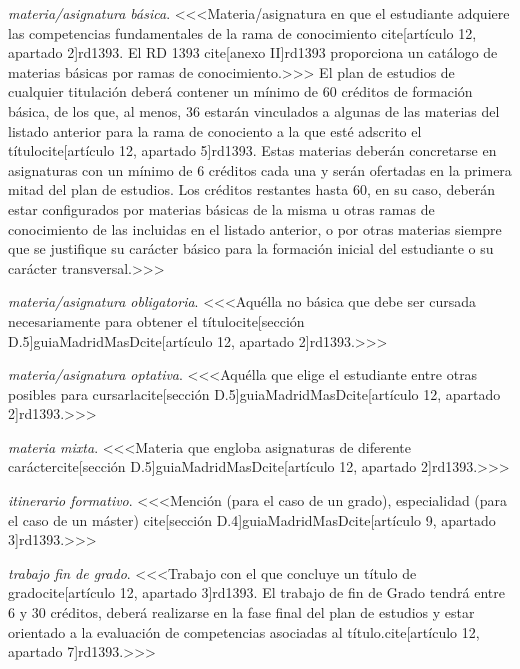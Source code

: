     \item \emph{materia/asignatura básica}. <<<Materia/asignatura en que el estudiante adquiere las competencias fundamentales de la rama de conocimiento cite[artículo 12, apartado 2]{rd1393}. El RD 1393 cite[anexo II]{rd1393} proporciona un catálogo de materias básicas por ramas de conocimiento.>>> El plan de estudios de cualquier titulación deberá contener un mínimo de 60 créditos de formación básica, de los que, al menos, 36 estarán vinculados a algunas de las materias del listado anterior para la rama de conociento a la que esté adscrito el títulocite[artículo 12, apartado 5]{rd1393}.  Estas materias deberán concretarse en asignaturas con un mínimo de 6 créditos cada una y serán ofertadas en la primera mitad del plan de estudios.  Los créditos restantes hasta 60, en su caso, deberán estar configurados por materias básicas de la misma u otras ramas de conocimiento de las incluidas en el listado anterior, o por otras materias siempre que se justifique su carácter básico para la formación inicial del estudiante o su carácter transversal.>>>

    \item \emph{materia/asignatura obligatoria}. <<<Aquélla no básica que debe ser cursada necesariamente para obtener el títulocite[sección D.5]{guiaMadridMasD}cite[artículo 12, apartado 2]{rd1393}.>>>

    \item \emph{materia/asignatura optativa}. <<<Aquélla que elige el estudiante entre otras posibles para cursarlacite[sección D.5]{guiaMadridMasD}cite[artículo 12, apartado 2]{rd1393}.>>>

    \item \emph{materia mixta}. <<<Materia que engloba asignaturas de diferente caráctercite[sección D.5]{guiaMadridMasD}cite[artículo 12, apartado 2]{rd1393}.>>>

    \item \emph{itinerario formativo}. <<<Mención (para el caso de un grado), especialidad (para el caso de un máster) cite[sección D.4]{guiaMadridMasD}cite[artículo 9, apartado 3]{rd1393}.>>>
 
    \item \emph{trabajo fin de grado}. <<<Trabajo con el que concluye un título de gradocite[artículo 12, apartado 3]{rd1393}. El trabajo de fin de Grado tendrá entre 6 y 30 créditos, deberá realizarse en la fase final del plan de estudios y estar orientado a la evaluación de competencias asociadas al título.cite[artículo 12, apartado 7]{rd1393}.>>>

